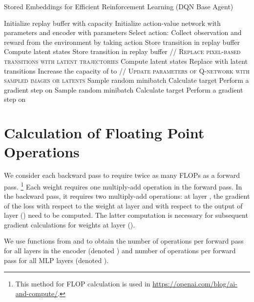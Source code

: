 \documentclass{article}
\begin{document}
\begin{algorithm*}
\caption{Stored Embeddings for Efficient Reinforcement Learning (DQN Base Agent)}\label{euclid}
\begin{algorithmic}[1]
\State Initialize replay buffer  with capacity 
\State Initialize action-value network  with parameters  and encoder  with parameters 
    \State Select action: 
    \State Collect observation  and reward  from the environment by taking action 
    \If{}
        \State Store transition  in replay buffer 
    \Else
        \State Compute latent states 
        \State Store transition  in replay buffer 
    \EndIf
    \State \textsc{// Replace pixel-based transitions with latent trajectories}
    \If{}
        \State Compute latent states 
        \State Replace  with latent transitions 
        \State Increase the capacity of  to 
    \EndIf
    \State \textsc{// Update parameters of Q-network with sampled images or latents}
        \If{}
            \State Sample random minibatch 
            \State Calculate target 
            \State Perform a gradient step on 
        \Else
            \State Sample random minibatch 
            \State Calculate target 
            \State Perform a gradient step on 
        \EndIf
    \EndFor
    
\EndFor
\item[]
\end{algorithmic} \label{lever_pseudocode}
\end{algorithm*} 

\section{Calculation of Floating Point Operations} \label{appendix:flop_counting}
We consider each backward pass to require twice as many FLOPs as a forward pass. \footnote{This method for FLOP calculation is used in \url{https://openai.com/blog/ai-and-compute/}.} Each weight requires one multiply-add operation in the forward pass. In the backward pass, it requires two multiply-add operations: at layer , the gradient of the loss with respect to the weight at layer  and with respect to the output of layer () need to be computed. The latter computation is necessary for subsequent gradient calculations for weights at layer (). 

We use functions from \citet{huang2018condensenet} and \citet{jeong2019training} to obtain the number of operations per forward pass for all layers in the encoder (denoted ) and number of operations per forward pass for all MLP layers (denoted ). 
\end{document}
